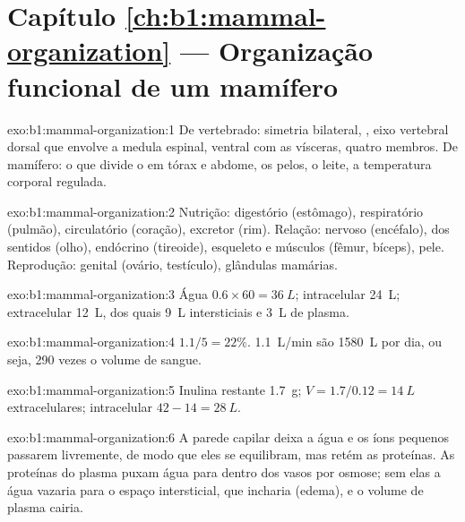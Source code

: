 \section*{Capítulo \ref{ch:b1:mammal-organization} --- Organização funcional de um mamífero}

\begin{solution}{exo:b1:mammal-organization:1}
De vertebrado: simetria bilateral, , eixo vertebral dorsal
que envolve a medula espinal,  ventral com as vísceras, quatro
membros. De mamífero: o  que divide o  em tórax e abdome,
os pelos, o leite, a temperatura corporal regulada.
\end{solution}

\begin{solution}{exo:b1:mammal-organization:2}
Nutrição: digestório (estômago), respiratório (pulmão), circulatório
(coração), excretor (rim). Relação: nervoso (encéfalo),  dos
sentidos (olho), endócrino (tireoide), esqueleto e músculos (fêmur,
bíceps), pele. Reprodução: genital (ovário, testículo), glândulas
mamárias.
\end{solution}

\begin{solution}{exo:b1:mammal-organization:3}
Água $0.6\times 60 = \qty{36}{L}$; intracelular \qty{24}{L};
extracelular \qty{12}{L}, dos quais \qty{9}{L} intersticiais e
\qty{3}{L} de plasma.
\end{solution}

\begin{solution}{exo:b1:mammal-organization:4}
$1.1/5 = 22\%$. \qty{1.1}{L/min} são \qty{1580}{L} por dia, ou seja, 290
vezes o volume de sangue.
\end{solution}

\begin{solution}{exo:b1:mammal-organization:5}
Inulina restante \qty{1.7}{g}; $V = 1.7/0.12 = \qty{14}{L}$
extracelulares; intracelular $42 - 14 = \qty{28}{L}$.
\end{solution}

\begin{solution}{exo:b1:mammal-organization:6}
A parede capilar deixa a água e os íons pequenos passarem livremente, de
modo que eles se equilibram, mas retém as proteínas. As proteínas do
plasma puxam água para dentro dos vasos por osmose; sem elas a água
vazaria para o espaço intersticial, que incharia (edema), e o volume de
plasma cairia.
\end{solution}

